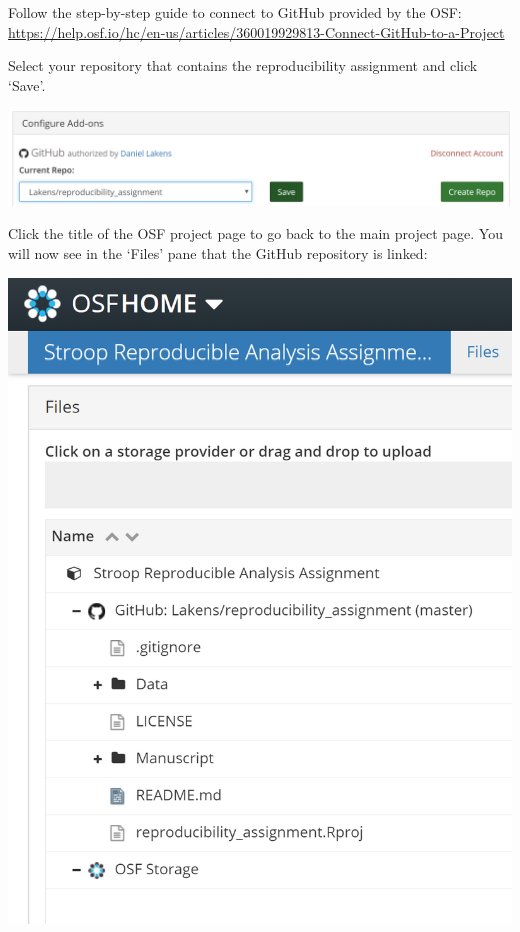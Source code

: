 \documentclass[
  oneside]{book}
\begin{document}
Follow the step-by-step guide to connect to GitHub provided by the OSF:
\url{https://help.osf.io/hc/en-us/articles/360019929813-Connect-GitHub-to-a-Project}

Select your repository that contains the reproducibility assignment and click
`Save'.

\begin{center}\includegraphics[width=1\linewidth]{images/7570fb87913b1d687a9b8a3a72948e24} \end{center}

Click the title of the OSF project page to go back to the main project page. You
will now see in the `Files' pane that the GitHub repository is linked:

\begin{center}\includegraphics[width=1\linewidth]{images/4ecc8e0af472a95a3f01baf3af0538cf} \end{center}
\end{document}
